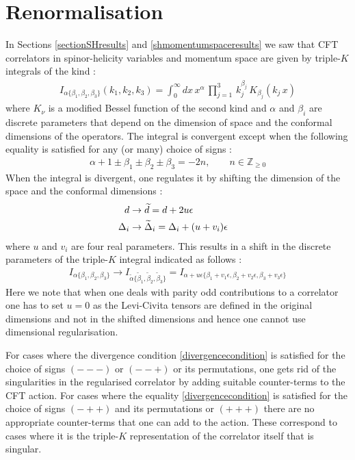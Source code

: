 \documentclass[a4paper,11pt]{article}
\begin{document}
\section{Renormalisation}\label{renor11}
In Sections \ref{sectionSHresults} and \ref{shmomentumspaceresults} we saw that CFT correlators in spinor-helicity variables and momentum space are given by triple-$K$ integrals of the kind :
%
\begin{align}\label{triplekint}
I_{\alpha\{\beta_1,\beta_2,\beta_3\}}(k_1,k_2,k_3)=\int_0^\infty dx\,x^\alpha\,\prod_{j=1}^3\,k_j^{\beta_j}\,K_{\beta_j}(k_j\,x)
\end{align}
%
where $K_\nu$ is a modified Bessel function of the second kind and $\alpha$ and $\beta_i$ are discrete parameters that depend on the dimension of space and the conformal dimensions of the operators. 
The integral is convergent except when the following equality is satisfied for any (or many) choice of signs \cite{Bzowski:2013sza,Bzowski:2015pba,Bzowski:2017poo,Bzowski:2018fql} :
\begin{align}
\label{divergencecondition}
\alpha+1\pm\beta_1\pm\beta_2\pm\beta_3=-2n,\quad\quad n\in\mathbb Z_{\ge 0}
\end{align}
%
When the integral is divergent, one regulates it by shifting the dimension of the space and the conformal dimensions \cite{Bzowski:2013sza,Bzowski:2015pba,Bzowski:2017poo,Bzowski:2018fql} :
%
\begin{align}
d&\rightarrow\widetilde d=d+2u\epsilon\cr
\Delta_i&\rightarrow\widetilde\Delta_i=\Delta_i+(u+v_i)\epsilon
\end{align}
%
where $u$ and $v_i$ are four real parameters. This results in a  shift in the discrete parameters of the triple-$K$ integral indicated as follows :
%
\begin{align}
I_{\alpha\{\beta_1,\beta_2,\beta_3\}}\rightarrow I_{\widetilde\alpha\{\widetilde\beta_1,\widetilde\beta_2,\widetilde\beta_3\}}=I_{\alpha+u\epsilon\{\beta_1+v_1\epsilon,\beta_2+v_2\epsilon,\beta_3+v_3\epsilon\}}
\end{align}
%
Here we note that when one deals with parity odd contributions to a correlator one has to set $u=0$ as the Levi-Civita tensors are defined in the original dimensions and not in the shifted dimensions and hence one cannot use dimensional regularisation.

For cases where the divergence condition \eqref{divergencecondition} is satisfied for the choice of signs $(---)$ or $(--+)$ or its permutations, one gets rid of the singularities in the regularised correlator by adding suitable counter-terms to the CFT action. For cases where the equality \eqref{divergencecondition} is satisfied for the choice of signs $(-++)$ and its permutations or $(+++)$ there are no appropriate counter-terms that one can add to the action. These correspond to cases where it is the triple-$K$ representation of the correlator itself that is singular\cite{Bzowski:2015pba,Bzowski:2017poo,Bzowski:2018fql}.
\end{document}
